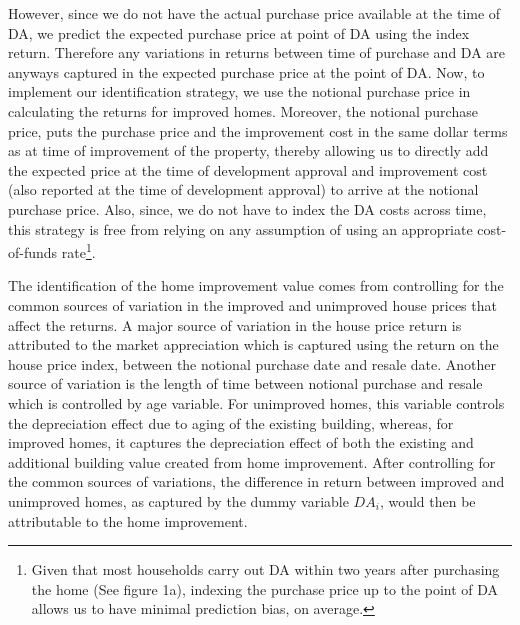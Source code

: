 \documentclass[AEJ,reqno, draftmode]{AEA} %
\begin{document}
However, since we do not have the actual purchase price available at the time of DA, we predict the expected purchase price at point of DA using the index return. Therefore any variations in returns between time of purchase and DA are anyways captured in the expected purchase price at the point of DA. Now, to implement our identification strategy, we use the notional purchase price in calculating the returns for improved homes. Moreover, the notional purchase price, puts the purchase price and the improvement cost in the same dollar terms as at time of improvement of the property, thereby allowing us to directly add the expected price at the time of development approval and improvement cost (also reported at the time of development approval) to arrive at the notional purchase price. Also, since, we do not have to index the DA costs across time, this strategy is free from relying on any assumption of using an appropriate cost-of-funds rate\footnote{Given that most households carry out DA within two years after purchasing the home (See figure 1a), indexing the purchase price up to the point of DA allows us to have minimal prediction bias, on average.}. 

The identification of the home improvement value comes from controlling for the common sources of variation in the improved and unimproved house prices that affect the returns. A major source of variation in the house price return is attributed to the market appreciation which is captured using the return on the house price index, between the notional purchase date and resale date. Another source of variation is the length of time between notional purchase and resale which is controlled by age variable. For unimproved homes, this variable controls the depreciation effect due to aging of the existing building, whereas, for improved homes, it captures the depreciation effect of both the existing and additional building value created from home improvement. After controlling for the common sources of variations, the difference in return between improved and unimproved homes, as captured by the dummy variable $DA_i$, would then be attributable to the home improvement.




\end{document}
